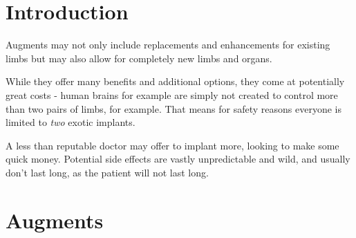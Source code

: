 \documentclass[12pt,a4paper,openany]{book}
\begin{document}
	

    \chapter{Introduction}
    Augments may not only include replacements and enhancements for existing limbs but may also allow for completely new limbs and organs.
    \par
    While they offer many benefits and additional options, they come at potentially great costs - human brains for example are simply not created to control more than two pairs of limbs, for example. That means for safety reasons everyone is limited to \emph{two} exotic implants.
    \par
    A less than reputable doctor may offer to implant more, looking to make some quick money. Potential side effects are vastly unpredictable and wild, and usually don't last long, as the patient will not last long.

    \chapter{Augments}
\end{document}
